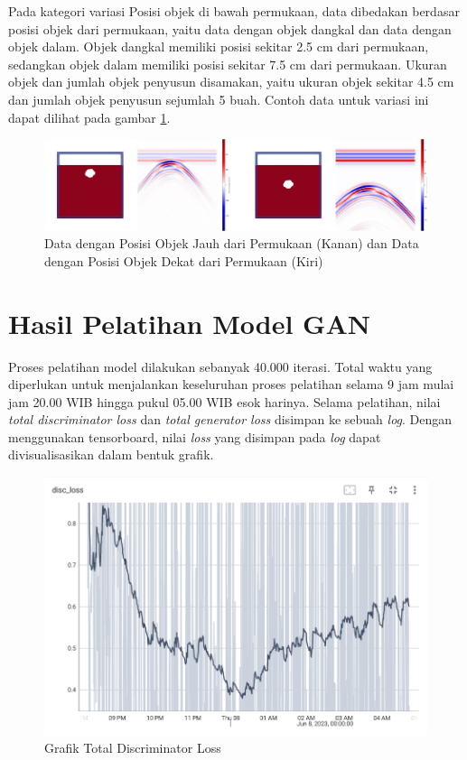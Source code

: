 Pada kategori variasi Posisi objek di bawah permukaan, data dibedakan berdasar posisi objek dari permukaan, yaitu data dengan objek dangkal dan data dengan objek dalam. 
Objek dangkal memiliki posisi sekitar 2.5 cm dari permukaan, sedangkan objek dalam memiliki posisi sekitar 7.5 cm dari permukaan. 
Ukuran objek dan jumlah objek penyusun disamakan, yaitu ukuran objek sekitar 4.5 cm dan jumlah objek penyusun sejumlah 5 buah. 
Contoh data untuk variasi ini dapat dilihat pada gambar \ref{fig:posisiData}.

\begin{figure}[ht]
  \centering
  \includegraphics[scale=0.4]{gambar/variasi kedalaman.png}
  \caption{Data dengan Posisi Objek Jauh dari Permukaan (Kanan) dan Data dengan Posisi Objek Dekat dari Permukaan (Kiri)}
  \label{fig:posisiData}
\end{figure}

\section{Hasil Pelatihan Model GAN}
\label{sec:hasilpelatihanGAN}

Proses pelatihan model dilakukan sebanyak 40.000 iterasi. 
Total waktu yang diperlukan untuk menjalankan keseluruhan proses pelatihan selama 9 jam mulai jam 20.00 WIB hingga pukul 05.00 WIB esok harinya. 
Selama pelatihan, nilai \emph{total discriminator loss} dan \emph{total generator loss} disimpan ke sebuah \emph{log}. 
Dengan menggunakan tensorboard, nilai \emph{loss} yang disimpan pada \emph{log} dapat divisualisasikan dalam bentuk grafik. 

\begin{figure}[ht]
  \centering
  \includegraphics[scale=0.6]{gambar/Disc_loss.png}
  \caption{Grafik Total Discriminator Loss}
  \label{fig:discLoss}
\end{figure}


